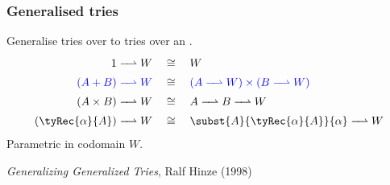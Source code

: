 \begin{frame}
\frametitle{Generalised tries}

Generalise tries over  to tries over an .
\begin{align*}
1 \toFin W
&\quad\cong\quad
W
\\
\textcolor{blue}{(A + B) \toFin W}
&\quad\cong\quad
\textcolor{blue}{(A \toFin W) \times (B \toFin W)}
\\
(A \times B) \toFin W
&\quad\cong\quad
A \toFin B \toFin W
\\
(\tyRec{\alpha}{A}) \toFin W
&\quad\cong\quad
\subst{A}{\tyRec{\alpha}{A}}{\alpha} \toFin W
\end{align*}
Parametric in codomain $W$.

\vspace{10pt}
\emph{Generalizing Generalized Tries}, Ralf Hinze (1998)
\end{frame}

